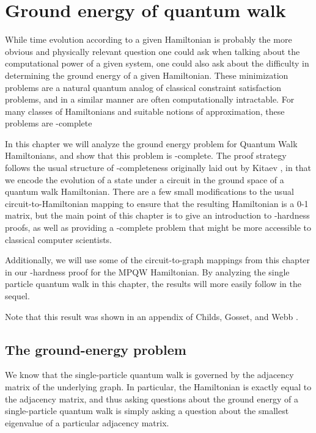 \documentclass[../thesis-main/thesis-main]{subfiles}
\begin{document}
\chapter{Ground energy of quantum walk}
\label{chap:SP_ground}

While time evolution according to a given Hamiltonian is probably the more obvious and physically relevant question one could ask when talking about the computational power of a given system, one could also ask about the difficulty in determining the ground energy of a given Hamiltonian.  These minimization problems are a natural quantum analog of classical constraint satisfaction problems, and in a similar manner are often computationally intractable.  For many classes of Hamiltonians and suitable notions of approximation, these problems are \QMA-complete

In this chapter we will analyze the ground energy problem for Quantum Walk Hamiltonians, and show that this problem is \QMA-complete.  The proof strategy follows the usual structure of \QMA-completeness originally laid out by Kitaev \cite{KSV02}, in that we encode the evolution of a state under a circuit in the ground space of a quantum walk Hamiltonian.  There are a few small modifications to the usual circuit-to-Hamiltonian mapping to ensure that the resulting Hamiltonian is a 0-1 matrix, but the main point of this chapter is to give an introduction to \QMA-hardness proofs, as well as providing a \QMA-complete problem that might be more accessible to classical computer scientists.  

Additionally, we will use some of the circuit-to-graph mappings from this chapter in our \QMA-hardness proof for the MPQW Hamiltonian.  By analyzing the single particle quantum walk in this chapter, the results will more easily follow in the sequel.  

Note that this result was shown in an appendix of Childs, Gosset, and Webb \cite{BHQMA}.

\section{The ground-energy problem}

We know that the single-particle quantum walk is governed by the adjacency matrix of the underlying graph.  In particular, the Hamiltonian is exactly equal to the adjacency matrix, and thus asking questions about the ground energy of a single-particle quantum walk is simply asking a question about the smallest eigenvalue of a particular adjacency matrix.
\end{document}
